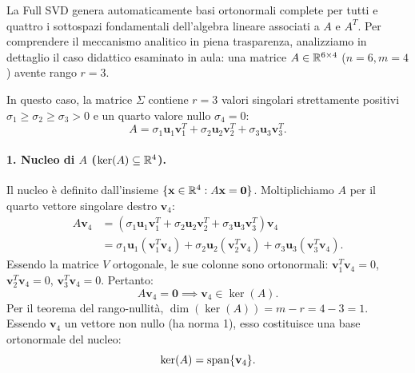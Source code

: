 La Full SVD genera automaticamente basi ortonormali complete per tutti e quattro i sottospazi fondamentali dell'algebra lineare associati a $A$ e $A^T$.
Per comprendere il meccanismo analitico in piena trasparenza, analizziamo in dettaglio il caso didattico esaminato in aula: una matrice $A \in \mathbb{R}^{6 \times 4}$ ($n = 6, m = 4$) avente rango $r = 3$.

In questo caso, la matrice $\Sigma$ contiene $r = 3$ valori singolari strettamente positivi $\sigma_1 \ge \sigma_2 \ge \sigma_3 > 0$ e un quarto valore nullo $\sigma_4 = 0$:
\begin{equation}
    A = \sigma_1 \mathbf{u}_1 \mathbf{v}_1^T + \sigma_2 \mathbf{u}_2 \mathbf{v}_2^T + \sigma_3 \mathbf{u}_3 \mathbf{v}_3^T.
\end{equation}

\paragraph{1. Nucleo di $A$ ($\ker(A) \subseteq \mathbb{R}^4$).}
Il nucleo \`e definito dall'insieme $\{\mathbf{x} \in \mathbb{R}^4 : A\mathbf{x} = \mathbf{0}\}$. Moltiplichiamo $A$ per il quarto vettore singolare destro $\mathbf{v}_4$:
\begin{align}
    A \mathbf{v}_4 &= \left( \sigma_1 \mathbf{u}_1 \mathbf{v}_1^T + \sigma_2 \mathbf{u}_2 \mathbf{v}_2^T + \sigma_3 \mathbf{u}_3 \mathbf{v}_3^T \right) \mathbf{v}_4 \nonumber \\
                   &= \sigma_1 \mathbf{u}_1 (\mathbf{v}_1^T \mathbf{v}_4) + \sigma_2 \mathbf{u}_2 (\mathbf{v}_2^T \mathbf{v}_4) + \sigma_3 \mathbf{u}_3 (\mathbf{v}_3^T \mathbf{v}_4).
\end{align}
Essendo la matrice $V$ ortogonale, le sue colonne sono ortonormali: $\mathbf{v}_1^T \mathbf{v}_4 = 0$, $\mathbf{v}_2^T \mathbf{v}_4 = 0$, $\mathbf{v}_3^T \mathbf{v}_4 = 0$. Pertanto:
\begin{equation}
    A \mathbf{v}_4 = \mathbf{0} \implies \mathbf{v}_4 \in \ker(A).
\end{equation}
Per il teorema del rango-nullit\`a, $\dim(\ker(A)) = m - r = 4 - 3 = 1$. Essendo $\mathbf{v}_4$ un vettore non nullo (ha norma 1), esso costituisce una base ortonormale del nucleo:
\begin{equation}
    \ker(A) = \operatorname{span}\{\mathbf{v}_4\}.
\end{equation}

